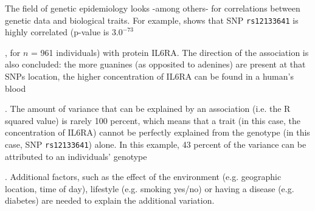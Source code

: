 The field of genetic epidemiology looks -among others- for
correlations between genetic data and biological traits.
For example, \cite{ahsan2017relative} shows that
SNP \verb|rs12133641| is highly correlated (p-value is $3.0^{-73}$

,
for $n$ = 961 individuals) with protein IL6RA.
The direction of the association is also concluded:
the more guanines (as opposited to adenines) are present at that SNPs location,
the higher concentration of IL6RA can be found in a human's blood

. The amount of variance that can be explained by an association (i.e.
the R squared value) is rarely 100 percent, which means that a trait (in
this case, the concentration of IL6RA) cannot be perfectly explained
from the genotype (in this case, SNP \verb|rs12133641|) alone. 
In this example, 43 percent of the variance 
can be attributed to an individuals' genotype

. Additional factors, 
such as the effect
of the environment (e.g. geographic location, time of day), 
lifestyle (e.g. smoking yes/no) or having a disease (e.g. diabetes) 
are needed to explain the additional variation.

